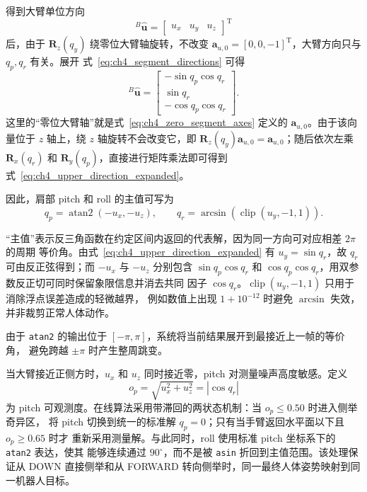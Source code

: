得到大臂单位方向
\begin{equation}
  {}^{B}\hat{\boldsymbol u}=
  \begin{bmatrix}u_x&u_y&u_z\end{bmatrix}^{\mathrm T}
  \label{eq:ch4_upper_direction_components}
\end{equation}
后，由于 $\boldsymbol R_z(q_y)$ 绕零位大臂轴旋转，不改变
$\boldsymbol a_{u,0}=[0,0,-1]^{\mathrm T}$，大臂方向只与 $q_p,q_r$ 有关。展开
式~\eqref{eq:ch4_segment_directions} 可得
\begin{equation}
  {}^{B}\hat{\boldsymbol u}=
  \begin{bmatrix}
    -\sin q_p\cos q_r\\
    \sin q_r\\
    -\cos q_p\cos q_r
  \end{bmatrix}.
  \label{eq:ch4_upper_direction_expanded}
\end{equation}
这里的“零位大臂轴”就是式~\eqref{eq:ch4_zero_segment_axes} 定义的
$\boldsymbol a_{u,0}$。由于该向量位于 $z$ 轴上，绕 $z$ 轴旋转不会改变它，即
$\boldsymbol R_z(q_y)\boldsymbol a_{u,0}=\boldsymbol a_{u,0}$；随后依次左乘
$\boldsymbol R_x(q_r)$ 和 $\boldsymbol R_y(q_p)$，直接进行矩阵乘法即可得到
式~\eqref{eq:ch4_upper_direction_expanded}。

因此，肩部 pitch 和 roll 的主值可写为
\begin{equation}
  q_p=\operatorname{atan2}(-u_x,-u_z),
  \qquad
  q_r=\arcsin(\operatorname{clip}(u_y,-1,1)).
  \label{eq:ch4_pitch_roll_inverse}
\end{equation}

“主值”表示反三角函数在约定区间内返回的代表解，因为同一方向可对应相差 $2\pi$ 的周期
等价角。由式~\eqref{eq:ch4_upper_direction_expanded} 有
$u_y=\sin q_r$，故 $q_r$ 可由反正弦得到；而 $-u_x$ 与 $-u_z$ 分别包含
$\sin q_p\cos q_r$ 和 $\cos q_p\cos q_r$，用双参数反正切可同时保留象限信息并消去共同
因子 $\cos q_r$。$\operatorname{clip}(u_y,-1,1)$ 只用于消除浮点误差造成的轻微越界，
例如数值上出现 $1+10^{-12}$ 时避免 $\arcsin$ 失效，并非裁剪正常人体动作。

由于 \texttt{atan2} 的输出位于 $[-\pi,\pi]$，系统将当前结果展开到最接近上一帧的等价角，
避免跨越 $\pm\pi$ 时产生整周跳变。

当大臂接近正侧方时，$u_x$ 和 $u_z$ 同时接近零，pitch 对测量噪声高度敏感。定义
\begin{equation}
  o_p=\sqrt{u_x^2+u_z^2}=|\cos q_r|
  \label{eq:ch4_pitch_observability}
\end{equation}
为 pitch 可观测度。在线算法采用带滞回的两状态机制：当 $o_p\leq0.50$ 时进入侧举奇异区，
将 pitch 切换到统一的标准解 $q_p=0$；只有当手臂返回水平面以下且 $o_p\geq0.65$ 时才
重新采用测量解。与此同时，roll 使用标准 pitch 坐标系下的 \texttt{atan2} 表达，使其
能够连续通过 $90^\circ$，而不是被 \texttt{asin} 折回到主值范围。该处理保证从 DOWN
直接侧举和从 FORWARD 转向侧举时，同一最终人体姿势映射到同一机器人目标。

